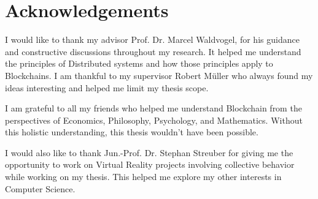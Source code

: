 \chapter{Acknowledgements}
	I would like to thank my advisor Prof. Dr. Marcel Waldvogel, for his guidance and constructive discussions throughout my research. It helped me understand the principles of Distributed systems and how those principles apply to Blockchains. I am thankful to my supervisor Robert Müller who always found my ideas interesting and helped me limit my thesis scope.
	
	I am grateful to all my friends who helped me understand Blockchain from the perspectives of Economics, Philosophy, Psychology, and Mathematics. Without this holistic understanding, this thesis wouldn't have been possible.
	
	I would also like to thank Jun.-Prof. Dr. Stephan Streuber for giving me the opportunity to work on Virtual Reality projects involving collective behavior while working on my thesis. This helped me explore my other interests in Computer Science.